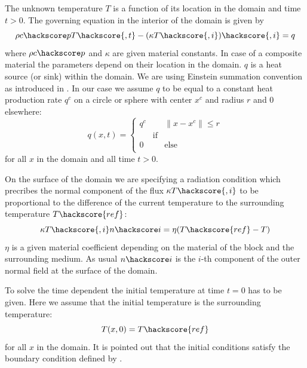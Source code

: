 The unknown temperature $T$ is a function of its location in the domain and time $t>0$. The governing equation
in the interior of the domain is given by
\begin{equation}
\rho c\hackscore p T\hackscore{,t} - (\kappa T\hackscore{,i})\hackscore{,i} = q
\label{DIFFUSION TEMP EQ 1}
\end{equation}
where $\rho c\hackscore p$ and $\kappa$ are given material constants. In case of a composite
material the parameters depend on their location in the domain. $q$ is
a heat source (or sink) within the domain. We are using Einstein summation convention  
as introduced in . In our case we assume $q$ to be equal to a constant heat production rate 
$q^{c}$ on a circle or sphere with center $x^c$ and radius $r$ and $0$ elsewhere:
\begin{equation}
q(x,t)=
\left\{ 
\begin{array}{lcl}
q^c  & & \|x-x^c\| \le r \\
     & \mbox{if} \\
0    &  & \mbox{else} \\
\end{array}
\right.
\label{DIFFUSION TEMP EQ 1b}
\end{equation}
for all $x$ in the domain and all time  $t>0$.

On the surface of the domain we are 
specifying a radiation condition 
which precribes the normal component of the flux $\kappa T\hackscore{,i}$ to be proportional
to the difference of the current temperature to the surrounding temperature $T\hackscore{ref}$:    
\begin{equation}
 \kappa T\hackscore{,i} n\hackscore i = \eta (T\hackscore{ref}-T) 
\label{DIFFUSION TEMP EQ 2}
\end{equation}
$\eta$ is a given material coefficient depending on the material of the block and the surrounding medium. 
As usual $n\hackscore i$ is the $i$-th component of the outer normal field 
at the surface of the domain. 

To solve the time dependent  the initial temperature at time 
$t=0$ has to be given. Here we assume that the initial temperature is the surrounding temperature:
\begin{equation}
T(x,0)=T\hackscore{ref} 
\label{DIFFUSION TEMP EQ 4}
\end{equation}
for all $x$ in the domain. It is pointed out that 
the initial conditions satisfy the 
boundary condition defined by . 

